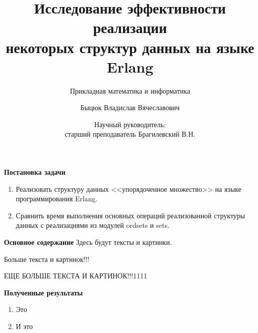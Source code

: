 \documentclass{beamer}
\title[Erlang]{Исследование эффективности реализации\\некоторых структур данных на языке Erlang}
\subtitle[ПМИ]{Прикладная математика и информатика}
\author[Быцюк В.В.]{Быцюк Владислав Вячеславович}
\date[Брагилевский В.Н.]{Научный руководитель:\\старший преподаватель Брагилевский В.Н.}
\begin{document}
	\begin{frame}
		\titlepage
	\end{frame}

	\begin{frame}{\LARGE \textbf{Постановка задачи}}
		\begin{enumerate}
			\item Реализовать структуру данных <<упорядоченное множество>> на языке программирования Erlang.
			\item Сравнить время выполнения основных операций реализованной структуры данных с реализациями из модулей
			  	  ordsets и sets. 
		\end{enumerate}
	\end{frame}
	
	\begin{frame}{\LARGE \textbf{Основное содержание}}
		Здесь будут тексты и картинки.
		
		Больше текста и картинок!!!
		
		ЕЩЕ БОЛЬШЕ ТЕКСТА И КАРТИНОК!!!1111
	\end{frame}

	
	
	\begin{frame}{\LARGE \textbf{Полученные результаты}}
		\begin{enumerate}
			\item Это
			\item И это
		\end{enumerate}
	\end{frame}
\end{document}
